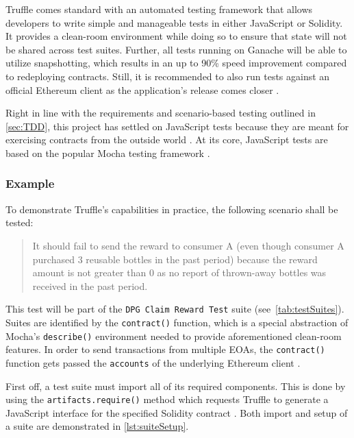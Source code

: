 Truffle comes standard with an automated testing framework that allows developers to write simple and manageable tests in either JavaScript or Solidity. It provides a clean-room environment while doing so to ensure that state will not be shared across test suites. Further, all tests running on Ganache will be able to utilize snapshotting, which results in an up to 90\% speed improvement compared to redeploying contracts. Still, it is recommended to also run tests against an official Ethereum client as the application's release comes closer \cite[Testing Your Contracts]{truffleSuite}. 

Right in line with the requirements and scenario-based testing outlined in \autoref{sec:TDD}, this project has settled on JavaScript tests because they are meant for exercising contracts from the outside world \cite[Testing Your Contracts]{truffleSuite}. At its core, JavaScript tests are based on the popular Mocha testing framework \cite[Writing Tests in JavaScript]{truffleSuite}. 

\subsubsection{Example}
To demonstrate Truffle's capabilities in practice, the following scenario shall be tested:

\begin{quotation}
It should fail to send the reward to consumer A (even though consumer A purchased 3 reusable bottles in the past period) because the reward amount is not greater than 0 as no report of thrown-away bottles was received in the past period.
\end{quotation}

This test will be part of the \texttt{DPG Claim Reward Test} suite (see~\autoref{tab:testSuites}). Suites are identified by the \texttt{contract()} function, which is a special abstraction of Mocha's \texttt{describe()} environment needed to provide aforementioned clean-room features. In order to send transactions from multiple \acp{EOA}, the \texttt{contract()} function gets passed the \texttt{accounts} of the underlying Ethereum client \cite[Writing Tests in JavaScript]{truffleSuite}.

First off, a test suite must import all of its required components. This is done by using the \texttt{artifacts.require()} method which requests Truffle to generate a JavaScript interface for the specified Solidity contract \cite[Writing Tests in JavaScript]{truffleSuite}. Both import and setup of a suite are demonstrated in \autoref{lst:suiteSetup}.

